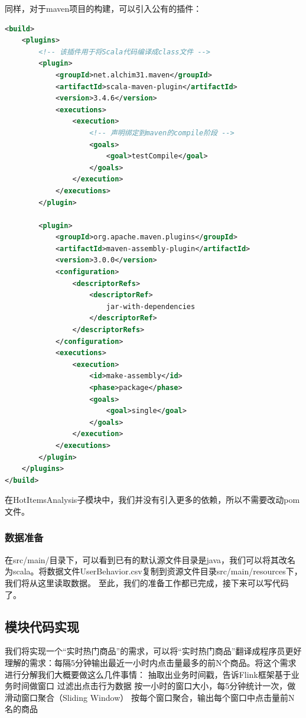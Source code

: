 \documentclass[oneside]{ctexbook}
\begin{document}
同样，对于maven项目的构建，可以引入公有的插件：

\begin{lstlisting}[language=xml, caption=UserBehaviorAnalysis/pom.xml]
<build>
    <plugins>
        <!-- 该插件用于将Scala代码编译成class文件 -->
        <plugin>
            <groupId>net.alchim31.maven</groupId>
            <artifactId>scala-maven-plugin</artifactId>
            <version>3.4.6</version>
            <executions>
                <execution>
                    <!-- 声明绑定到maven的compile阶段 -->
                    <goals>
                        <goal>testCompile</goal>
                    </goals>
                </execution>
            </executions>
        </plugin>

        <plugin>
            <groupId>org.apache.maven.plugins</groupId>
            <artifactId>maven-assembly-plugin</artifactId>
            <version>3.0.0</version>
            <configuration>
                <descriptorRefs>
                    <descriptorRef>
                        jar-with-dependencies
                    </descriptorRef>
                </descriptorRefs>
            </configuration>
            <executions>
                <execution>
                    <id>make-assembly</id>
                    <phase>package</phase>
                    <goals>
                        <goal>single</goal>
                    </goals>
                </execution>
            </executions>
        </plugin>
    </plugins>
</build>
\end{lstlisting}

在HotItemsAnalysis子模块中，我们并没有引入更多的依赖，所以不需要改动pom文件。

\subsubsection{数据准备}
在src/main/目录下，可以看到已有的默认源文件目录是java，我们可以将其改名为scala。将数据文件UserBehavior.csv复制到资源文件目录src/main/resources下，我们将从这里读取数据。
至此，我们的准备工作都已完成，接下来可以写代码了。

\subsection{模块代码实现}
我们将实现一个“实时热门商品”的需求，可以将“实时热门商品”翻译成程序员更好理解的需求：每隔5分钟输出最近一小时内点击量最多的前N个商品。将这个需求进行分解我们大概要做这么几件事情：
抽取出业务时间戳，告诉Flink框架基于业务时间做窗口
过滤出点击行为数据
按一小时的窗口大小，每5分钟统计一次，做滑动窗口聚合（Sliding Window）
按每个窗口聚合，输出每个窗口中点击量前N名的商品
\end{document}
